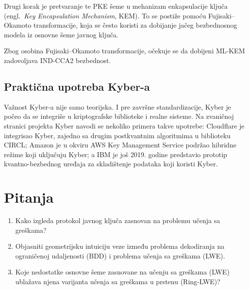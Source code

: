 Drugi korak je pretvaranje te PKE šeme u mehanizam enkapsulacije ključa
(engl.\ \emph{Key Encapsulation Mechanism}, KEM). 
To se postiže pomoću Fujisaki--Okamoto transformacije, 
koja se često koristi za dobijanje jačeg bezbednosnog modela iz osnovne šeme javnog ključa.

Zbog osobina Fujisaki--Okamoto transformacije, očekuje se da dobijeni ML-KEM 
zadovoljava IND-CCA2 bezbednost.~\cite{nistFips203}

\subsection{Praktična upotreba Kyber-a}

Važnost Kyber-a nije samo teorijska. 
I pre završne standardizacije, 
Kyber je počeo da se integriše u kriptografske biblioteke i realne sisteme. 
Na zvaničnoj stranici projekta Kyber navodi se nekoliko primera takve upotrebe:
Cloudflare je integrisao Kyber, zajedno sa drugim postkvantnim algoritmima u biblioteku CIRCL; 
Amazon je u okviru AWS Key Management Service podržao hibridne režime koji uključuju Kyber; 
a IBM je još 2019. godine predstavio prototip kvantno-bezbednog uređaja za skladištenje podataka koji koristi Kyber.

\section{Pitanja}

\begin{enumerate}
    \item Kako izgleda protokol javnog ključa zasnovan na problemu učenja sa greškama?
    \item Objasniti geometrijsku intuiciju veze između problema dekodiranja na ograničenoj udaljenosti (BDD) i problema učenja sa greškama (LWE).
    \item Koje nedostatke osnovne šeme zasnovane na učenju sa greškama (LWE) ublažava njena varijanta učenja
    sa greškama u prstenu (Ring-LWE)?
\end{enumerate}